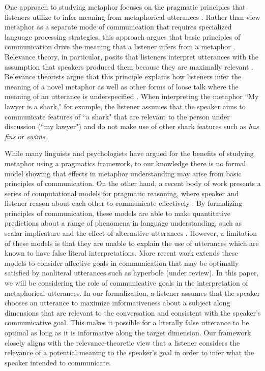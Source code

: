 \documentclass[10pt,letterpaper]{article}
\begin{document}
One approach to studying metaphor focuses on the pragmatic principles that listeners utilize to infer meaning from metaphorical utterances \cite{tendahl2008complementary}. Rather than view metaphor as a separate mode of communication that requires specialized language processing strategies, this approach argues that basic principles of communication drive the meaning that a listener infers from a metaphor \cite{sperber2008deflationary, wilson2006metaphor}. Relevance theory, in particular, posits that listeners interpret utterances with the assumption that speakers produced them because they are maximally relevant \cite{wilson2002relevance}. Relevance theorists argue that this principle explains how listeners infer the meaning of a novel metaphor as well as other forms of loose talk where the meaning of an utterance is underspecified  \cite{sperber1985loose}. When interpreting the metaphor ``My lawyer is a shark," for example, the listener assumes that the speaker aims to communicate features of  ``a shark" that are relevant to the person under discussion (``my lawyer") and do not make use of other shark features such as \emph{has fins} or \emph{swims}.

While many linguists and psychologists have argued for the benefits of studying metaphor using a pragmatics framework, to our knowledge there is no formal model showing that effects in metaphor understanding may arise from basic principles of communication. On the other hand, a recent body of work presents a series of computational models for pragmatic reasoning, where speaker and listener reason about each other to communicate effectively \cite{frank2012predicting, jager2009pragmatic}. By formalizing principles of communication, these models are able to make quantitative predictions about a range of phenomena in language understanding, such as scalar implicature and the effect of alternative utterances \cite{goodman2013knowledge, bergen2012s}. However, a limitation of these models is that they are unable to explain the use of utterances which are known to have false literal interpretations. More recent work extends these models to consider affective goals in communication that may be optimally satisfied by nonliteral utterances such as hyperbole (under review). In this paper, we will be considering the role of communicative goals in the interpretation of metaphorical utterances. In our formalization, a listener assumes that the speaker chooses an utterance to maximize informativeness about a subject along dimensions that are relevant to the conversation and consistent with the speaker's communicative goal. This makes it possible for a literally false utterance to be optimal as long as it is informative along the target dimension. Our framework closely aligns with the relevance-theoretic view that a listener considers the relevance of a potential meaning to the speaker's goal in order to infer what the speaker intended to communicate. 
\end{document}

